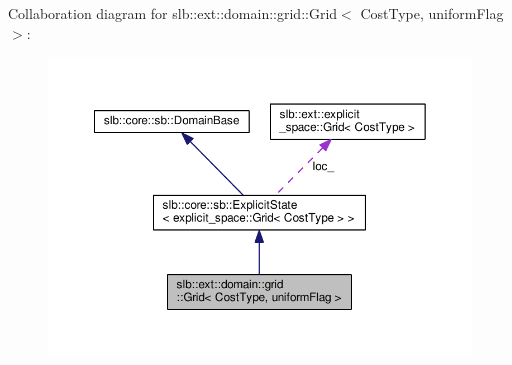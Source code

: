 Collaboration diagram for slb\+:\+:ext\+:\+:domain\+:\+:grid\+:\+:Grid$<$ Cost\+Type, uniform\+Flag $>$\+:\nopagebreak
\begin{figure}[H]
\begin{center}
\leavevmode
\includegraphics[width=350pt]{structslb_1_1ext_1_1domain_1_1grid_1_1Grid__coll__graph}
\end{center}
\end{figure}

